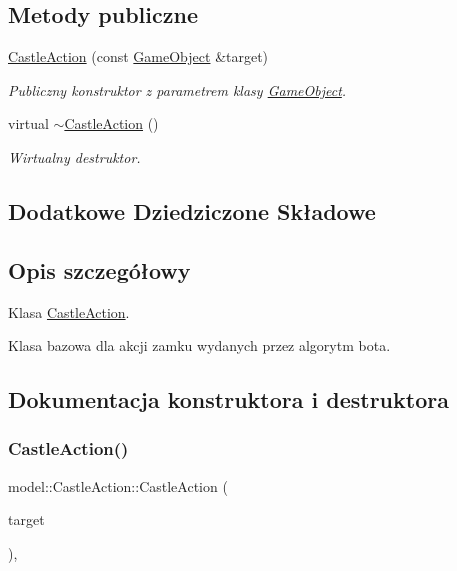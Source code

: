 \subsection*{Metody publiczne}
\begin{DoxyCompactItemize}
\item 
\hyperlink{classmodel_1_1CastleAction_ab40d2d8ae98e800d3feb596296476e33}{Castle\+Action} (const \hyperlink{classmodel_1_1GameObject}{Game\+Object} \&target)
\begin{DoxyCompactList}\small\item\em Publiczny konstruktor z parametrem klasy \hyperlink{classmodel_1_1GameObject}{Game\+Object}. \end{DoxyCompactList}\item 
\mbox{\label{classmodel_1_1CastleAction_a93842e1154b02939c422f143f20694d3}} 
virtual \hyperlink{classmodel_1_1CastleAction_a93842e1154b02939c422f143f20694d3}{$\sim$\+Castle\+Action} ()
\begin{DoxyCompactList}\small\item\em Wirtualny destruktor. \end{DoxyCompactList}\end{DoxyCompactItemize}
\subsection*{Dodatkowe Dziedziczone Składowe}


\subsection{Opis szczegółowy}
Klasa \hyperlink{classmodel_1_1CastleAction}{Castle\+Action}. 

Klasa bazowa dla akcji zamku wydanych przez algorytm bota. 

\subsection{Dokumentacja konstruktora i destruktora}
\mbox{\label{classmodel_1_1CastleAction_ab40d2d8ae98e800d3feb596296476e33}} 
\subsubsection{\texorpdfstring{Castle\+Action()}{CastleAction()}}
{\footnotesize\ttfamily model\+::\+Castle\+Action\+::\+Castle\+Action (\begin{DoxyParamCaption}\item[{const \hyperlink{classmodel_1_1GameObject}{Game\+Object} \&}]{target }\end{DoxyParamCaption})\hspace{0.3cm}{\ttfamily [inline]}, {\ttfamily [explicit]}}




